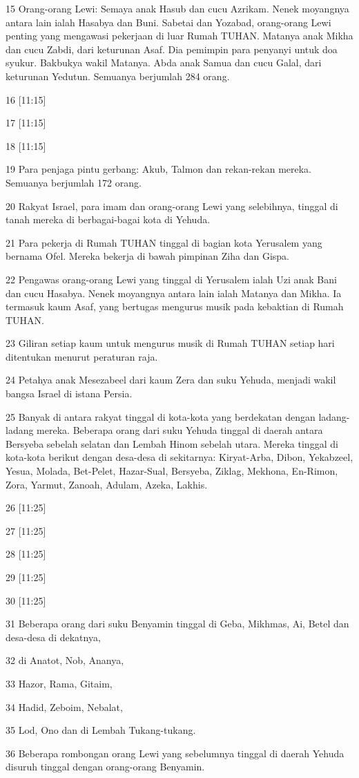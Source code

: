 \par 15 Orang-orang Lewi: Semaya anak Hasub dan cucu Azrikam. Nenek moyangnya antara lain ialah Hasabya dan Buni. Sabetai dan Yozabad, orang-orang Lewi penting yang mengawasi pekerjaan di luar Rumah TUHAN. Matanya anak Mikha dan cucu Zabdi, dari keturunan Asaf. Dia pemimpin para penyanyi untuk doa syukur. Bakbukya wakil Matanya. Abda anak Samua dan cucu Galal, dari keturunan Yedutun. Semuanya berjumlah 284 orang.
\par 16 [11:15]
\par 17 [11:15]
\par 18 [11:15]
\par 19 Para penjaga pintu gerbang: Akub, Talmon dan rekan-rekan mereka. Semuanya berjumlah 172 orang.
\par 20 Rakyat Israel, para imam dan orang-orang Lewi yang selebihnya, tinggal di tanah mereka di berbagai-bagai kota di Yehuda.
\par 21 Para pekerja di Rumah TUHAN tinggal di bagian kota Yerusalem yang bernama Ofel. Mereka bekerja di bawah pimpinan Ziha dan Gispa.
\par 22 Pengawas orang-orang Lewi yang tinggal di Yerusalem ialah Uzi anak Bani dan cucu Hasabya. Nenek moyangnya antara lain ialah Matanya dan Mikha. Ia termasuk kaum Asaf, yang bertugas mengurus musik pada kebaktian di Rumah TUHAN.
\par 23 Giliran setiap kaum untuk mengurus musik di Rumah TUHAN setiap hari ditentukan menurut peraturan raja.
\par 24 Petahya anak Mesezabeel dari kaum Zera dan suku Yehuda, menjadi wakil bangsa Israel di istana Persia.
\par 25 Banyak di antara rakyat tinggal di kota-kota yang berdekatan dengan ladang-ladang mereka. Beberapa orang dari suku Yehuda tinggal di daerah antara Bersyeba sebelah selatan dan Lembah Hinom sebelah utara. Mereka tinggal di kota-kota berikut dengan desa-desa di sekitarnya: Kiryat-Arba, Dibon, Yekabzeel, Yesua, Molada, Bet-Pelet, Hazar-Sual, Bersyeba, Ziklag, Mekhona, En-Rimon, Zora, Yarmut, Zanoah, Adulam, Azeka, Lakhis.
\par 26 [11:25]
\par 27 [11:25]
\par 28 [11:25]
\par 29 [11:25]
\par 30 [11:25]
\par 31 Beberapa orang dari suku Benyamin tinggal di Geba, Mikhmas, Ai, Betel dan desa-desa di dekatnya,
\par 32 di Anatot, Nob, Ananya,
\par 33 Hazor, Rama, Gitaim,
\par 34 Hadid, Zeboim, Nebalat,
\par 35 Lod, Ono dan di Lembah Tukang-tukang.
\par 36 Beberapa rombongan orang Lewi yang sebelumnya tinggal di daerah Yehuda disuruh tinggal dengan orang-orang Benyamin.


